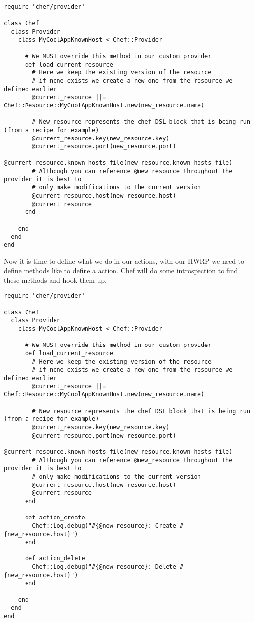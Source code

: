 \begin{lstlisting}[label=lst:cookbook-hwrp6]
require 'chef/provider'

class Chef
  class Provider
    class MyCoolAppKnownHost < Chef::Provider

      # We MUST override this method in our custom provider
      def load_current_resource
        # Here we keep the existing version of the resource
        # if none exists we create a new one from the resource we defined earlier
        @current_resource ||= Chef::Resource::MyCoolAppKnownHost.new(new_resource.name)

        # New resource represents the chef DSL block that is being run (from a recipe for example)
        @current_resource.key(new_resource.key)
        @current_resource.port(new_resource.port)
        @current_resource.known_hosts_file(new_resource.known_hosts_file)
        # Although you can reference @new_resource throughout the provider it is best to
        # only make modifications to the current version
        @current_resource.host(new_resource.host)
        @current_resource
      end

    end
  end
end
\end{lstlisting}

Now it is time to define what we do in our actions, with our HWRP we need to define methods like  to define a  action. Chef will do some introspection to find these methods and hook them up.

\begin{lstlisting}[label=lst:cookbook-hwrp7]
require 'chef/provider'

class Chef
  class Provider
    class MyCoolAppKnownHost < Chef::Provider

      # We MUST override this method in our custom provider
      def load_current_resource
        # Here we keep the existing version of the resource
        # if none exists we create a new one from the resource we defined earlier
        @current_resource ||= Chef::Resource::MyCoolAppKnownHost.new(new_resource.name)

        # New resource represents the chef DSL block that is being run (from a recipe for example)
        @current_resource.key(new_resource.key)
        @current_resource.port(new_resource.port)
        @current_resource.known_hosts_file(new_resource.known_hosts_file)
        # Although you can reference @new_resource throughout the provider it is best to
        # only make modifications to the current version
        @current_resource.host(new_resource.host)
        @current_resource
      end

      def action_create
        Chef::Log.debug("#{@new_resource}: Create #{new_resource.host}")
      end

      def action_delete
        Chef::Log.debug("#{@new_resource}: Delete #{new_resource.host}")
      end

    end
  end
end
\end{lstlisting}

